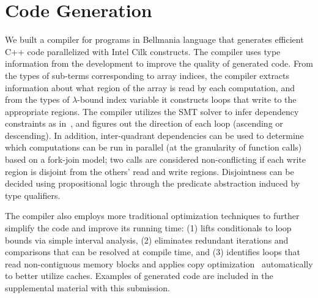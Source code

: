 \section{Code Generation}
\label{codegen}

We built a compiler for programs in Bellmania language that generates efficient C++ code parallelized with Intel Cilk constructs. The compiler uses type information from the development to improve the
quality of generated code. From the types of sub-terms corresponding
to array indices, the compiler extracts information about what region
of the array is read by each computation, and from the types of $\lambda$-bound index variable it constructs loops that write to
the appropriate regions. The compiler utilizes the SMT solver to infer dependency constraints as in~\cite{JACM67/Karp},
and figures out the direction of each loop (ascending or descending). 
In addition, inter-quadrant dependencies can be used to determine which computations can be run in parallel (at the granularity of
function calls) based on a fork-join model;
two calls are considered non-conflicting if each write region is disjoint from the others' read and write regions.
Disjointness can be decided using propositional logic through the predicate abstraction induced by type qualifiers.

The compiler also employs more traditional optimization techniques
to further simplify the code and improve its running time:
(1) lifts conditionals to loop bounds via simple interval analysis, %
(2) eliminates redundant iterations and comparisons that can be resolved at compile time,
and (3) identifies loops that read non-contiguous memory blocks and applies copy optimization~\cite{ASPLOS91/Lam} automatically to better utilize caches. Examples of generated code are included in the supplemental material with this submission.

 

